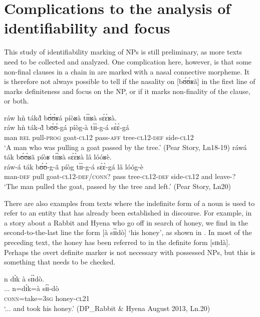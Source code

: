 \documentclass[output=paper]{langsci/langscibook}
\begin{document}
\section{Complications to the analysis of identifiability and focus}\label{sec:teo:7}

This study of identifiability marking of NPs is still preliminary, as more texts need to be collected and analyzed. One complication here, however, is that some non-final clauses in a chain in  are marked with a nasal connective morpheme. It is therefore not always possible to tell if the nasality on [b\'ʊ\'ʊʁã] in the first line of  marks definiteness and focus on the NP, or if it marks non-finality of the clause, or both.

\ea\label{ex:teo:57}
\glll ráw hǹ ták\`{d} b\'ʊ\'ʊʁá píòʁà t\'ɪ\`ɪʁà s\'ɛ\`ɛʁà.\\
ráw hǹ ták-\`{d} b\'ʊ\'ʊ-gá píòg-à t\`ɪ\`ɪ-g-á s\`ɛ\`ɛ-gá\\
man \textsc{rel} pull-\textsc{prog} goat-\textsc{cl12} pass-\textsc{aff} tree\textsc{-cl12-def} side\textsc{-cl12}{\rmfnm}\\
\glt ‘A man who was pulling a goat passed by the tree.’ (Pear Story, Ln18-19)
\z
{}
\ea\label{ex:teo:58}
\glll ráwá ták b\'ʊ\'ʊʁã píòʁ t\'ɪ\`ɪʁà s\'ɛ\`ɛʁà lâ lóóʁè.\\
ráw-á ták b\'ʊ\'ʊ-g-ã píòg t\`ɪ\`ɪ-g-á s\`ɛ\`ɛ-gá lâ lóóg-è\\ 
man-\textsc{def} pull goat-\textsc{cl12-}\textsc{def/conn?} pass tree\textsc{-cl12-def} side\textsc{-cl12} and leave-?\\
\glt ‘The man pulled the goat, passed by the tree and left.’ (Pear Story, Ln20)
\z

There are also examples from texts where the indefinite form of a noun is used to refer to an entity that has already been established in discourse. For example, in a story about a Rabbit and Hyena who go off in search of honey, we find in the second-to-the-last line the form [à s\'ɪ\`ɪdò] ‘his honey’, as shown in . In most of the preceding text, the honey has been referred to in the definite form [sɪɪdà]. Perhaps the overt definite marker is not necessary with possessed NPs, but this is something that needs to be checked. 


\ea\label{ex:teo:59}
 {n d\'ɪk à} s\'ɪ\`ɪdò.\\
{...} n=d\'ɪk=à s\'ɪ\`ɪ-dò\\
{}  \textsc{conn}=take=\textsc{3sg} honey-\textsc{cl21}\\
\glt ‘... and took his honey.’ (DP\_Rabbit \& Hyena August 2013, Ln.20)
\z
\end{document}
